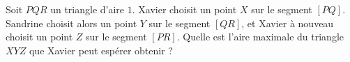 Soit $PQR$ un triangle d'aire $1$. Xavier choisit un point $X$ sur le segment $[PQ]$. Sandrine choisit alors un point $Y$ sur le segment $[QR]$, et Xavier à nouveau choisit un point $Z$ sur le segment $[PR]$. Quelle est l'aire maximale du triangle $XYZ$ que Xavier peut espérer obtenir ?
